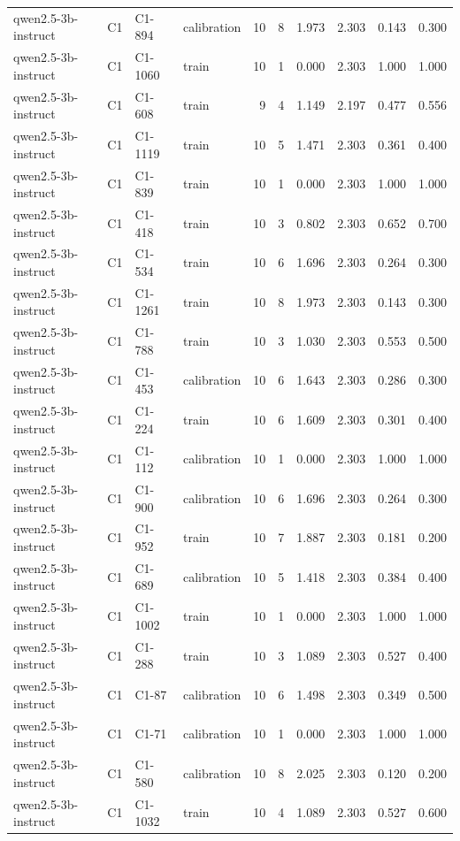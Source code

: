 \begin{table}
\begin{tabular}{llllrrrrrr}
qwen2.5-3b-instruct & C1 & C1-894 & calibration & 10 & 8 & 1.973 & 2.303 & 0.143 & 0.300 \\
qwen2.5-3b-instruct & C1 & C1-1060 & train & 10 & 1 & 0.000 & 2.303 & 1.000 & 1.000 \\
qwen2.5-3b-instruct & C1 & C1-608 & train & 9 & 4 & 1.149 & 2.197 & 0.477 & 0.556 \\
qwen2.5-3b-instruct & C1 & C1-1119 & train & 10 & 5 & 1.471 & 2.303 & 0.361 & 0.400 \\
qwen2.5-3b-instruct & C1 & C1-839 & train & 10 & 1 & 0.000 & 2.303 & 1.000 & 1.000 \\
qwen2.5-3b-instruct & C1 & C1-418 & train & 10 & 3 & 0.802 & 2.303 & 0.652 & 0.700 \\
qwen2.5-3b-instruct & C1 & C1-534 & train & 10 & 6 & 1.696 & 2.303 & 0.264 & 0.300 \\
qwen2.5-3b-instruct & C1 & C1-1261 & train & 10 & 8 & 1.973 & 2.303 & 0.143 & 0.300 \\
qwen2.5-3b-instruct & C1 & C1-788 & train & 10 & 3 & 1.030 & 2.303 & 0.553 & 0.500 \\
qwen2.5-3b-instruct & C1 & C1-453 & calibration & 10 & 6 & 1.643 & 2.303 & 0.286 & 0.300 \\
qwen2.5-3b-instruct & C1 & C1-224 & train & 10 & 6 & 1.609 & 2.303 & 0.301 & 0.400 \\
qwen2.5-3b-instruct & C1 & C1-112 & calibration & 10 & 1 & 0.000 & 2.303 & 1.000 & 1.000 \\
qwen2.5-3b-instruct & C1 & C1-900 & calibration & 10 & 6 & 1.696 & 2.303 & 0.264 & 0.300 \\
qwen2.5-3b-instruct & C1 & C1-952 & train & 10 & 7 & 1.887 & 2.303 & 0.181 & 0.200 \\
qwen2.5-3b-instruct & C1 & C1-689 & calibration & 10 & 5 & 1.418 & 2.303 & 0.384 & 0.400 \\
qwen2.5-3b-instruct & C1 & C1-1002 & train & 10 & 1 & 0.000 & 2.303 & 1.000 & 1.000 \\
qwen2.5-3b-instruct & C1 & C1-288 & train & 10 & 3 & 1.089 & 2.303 & 0.527 & 0.400 \\
qwen2.5-3b-instruct & C1 & C1-87 & calibration & 10 & 6 & 1.498 & 2.303 & 0.349 & 0.500 \\
qwen2.5-3b-instruct & C1 & C1-71 & calibration & 10 & 1 & 0.000 & 2.303 & 1.000 & 1.000 \\
qwen2.5-3b-instruct & C1 & C1-580 & calibration & 10 & 8 & 2.025 & 2.303 & 0.120 & 0.200 \\
qwen2.5-3b-instruct & C1 & C1-1032 & train & 10 & 4 & 1.089 & 2.303 & 0.527 & 0.600 \\

\end{tabular}
\end{table}
